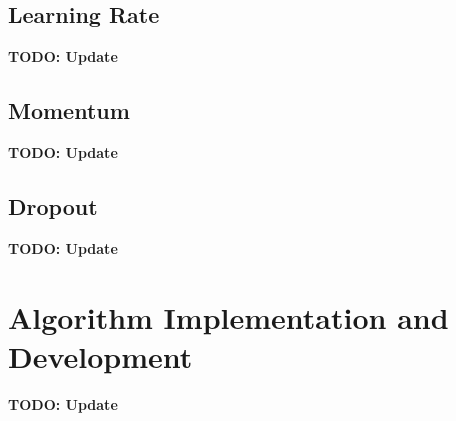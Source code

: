 \documentclass[11pt]{amsart}
\begin{document}
\subsection{Learning Rate}
\textbf{TODO: Update}

\subsection{Momentum}
\textbf{TODO: Update}

\subsection{Dropout}
\textbf{TODO: Update}

\section{Algorithm Implementation and Development}\label{sec:algorithms}
\textbf{TODO: Update}



\end{document}

